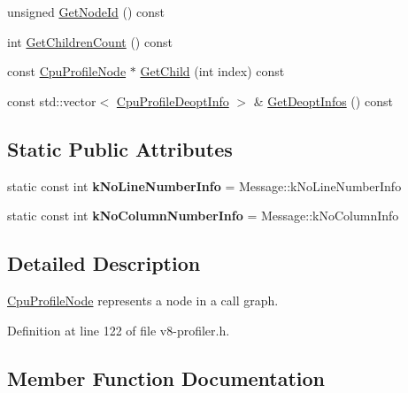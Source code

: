 \begin{DoxyCompactItemize}
\item 
unsigned \mbox{\hyperlink{classv8_1_1CpuProfileNode_a67334450071a60ec3c3cfa58777cc006}{Get\+Node\+Id}} () const
\item 
int \mbox{\hyperlink{classv8_1_1CpuProfileNode_afc0f772f6dad49b670c7b9675d27c688}{Get\+Children\+Count}} () const
\item 
const \mbox{\hyperlink{classv8_1_1CpuProfileNode}{Cpu\+Profile\+Node}} $\ast$ \mbox{\hyperlink{classv8_1_1CpuProfileNode_a9432760b2ab86fe7536b7f7b264ff0ae}{Get\+Child}} (int index) const
\item 
const std\+::vector$<$ \mbox{\hyperlink{structv8_1_1CpuProfileDeoptInfo}{Cpu\+Profile\+Deopt\+Info}} $>$ \& \mbox{\hyperlink{classv8_1_1CpuProfileNode_ade83e1a3fef2404d0d2d1289aad4ddd9}{Get\+Deopt\+Infos}} () const
\end{DoxyCompactItemize}
\subsection*{Static Public Attributes}
\begin{DoxyCompactItemize}
\item 
\mbox{\label{classv8_1_1CpuProfileNode_ad54213fe8a795cb6669566f0272fc5ba}} 
static const int {\bfseries k\+No\+Line\+Number\+Info} = Message\+::k\+No\+Line\+Number\+Info
\item 
\mbox{\label{classv8_1_1CpuProfileNode_a7c8c1dea3ae0cf4c219b7b1f15a8405b}} 
static const int {\bfseries k\+No\+Column\+Number\+Info} = Message\+::k\+No\+Column\+Info
\end{DoxyCompactItemize}


\subsection{Detailed Description}
\mbox{\hyperlink{classv8_1_1CpuProfileNode}{Cpu\+Profile\+Node}} represents a node in a call graph. 

Definition at line 122 of file v8-\/profiler.\+h.



\subsection{Member Function Documentation}
\mbox{\label{classv8_1_1CpuProfileNode_a4c811a611ba68f0484ad3eb560898889}} 
